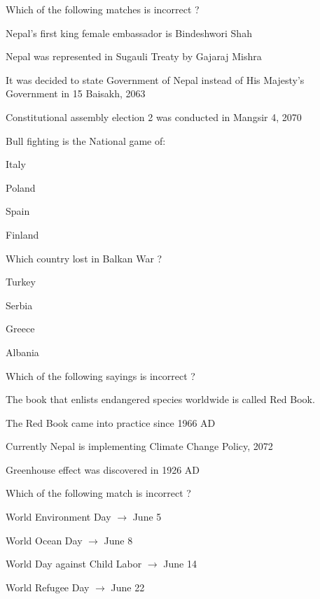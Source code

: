 \begin{questions}
\question Which of the following matches is incorrect ?
  \begin{items}
  \item* Nepal's first king female embassador is Bindeshwori Shah
  \item Nepal was represented in Sugauli Treaty by Gajaraj Mishra
  \item It was decided to state Government of Nepal instead of His Majesty's Government in 15 Baisakh, 2063
  \item Constitutional assembly election 2 was conducted in Mangsir 4, 2070
  \end{items}

\question Bull fighting is the National game of:
  \begin{items}
  \item Italy
  \item Poland
  \item* Spain
  \item Finland
  \end{items}

\question Which country lost in Balkan War ?
  \begin{items}
  \item* Turkey
  \item Serbia
  \item Greece
  \item Albania
  \end{items}

\question Which of the following sayings is incorrect ?
  \begin{items}
  \item The book that enlists endangered species worldwide is called Red Book.
  \item The Red Book came into practice since 1966 AD
  \item* Currently Nepal is implementing Climate Change Policy, 2072
  \item Greenhouse effect was discovered in 1926 AD
  \end{items}

\question Which of the following match is incorrect ?
  \begin{items}
  \item World Environment Day $\longrightarrow$ June 5
  \item World Ocean Day $\longrightarrow$ June 8
  \item World Day against Child Labor $\longrightarrow$ June 14
  \item* World Refugee Day $\longrightarrow$ June 22
  \end{items}


\end{questions}
